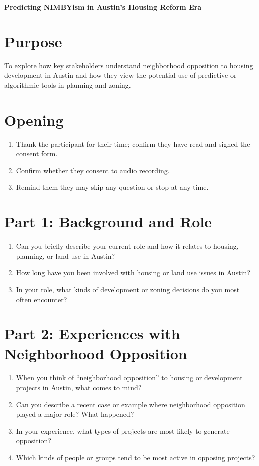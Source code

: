\documentclass[10pt, letterpaper]{article}
\begin{document}
\begin{center}
    {\Large \textbf{\color{columbiablue_official} Predicting NIMBYism in Austin’s Housing Reform Era}}
\end{center}

\section*{Purpose}
To explore how key stakeholders understand neighborhood opposition to housing development in Austin and how they view the potential use of predictive or algorithmic tools in planning and zoning.

\section*{Opening}
\begin{enumerate}[leftmargin=*, label=\arabic*.]
    \item Thank the participant for their time; confirm they have read and signed the consent form.
    \item Confirm whether they consent to audio recording.
    \item Remind them they may skip any question or stop at any time.
\end{enumerate}

\section*{Part 1: Background and Role}
\begin{enumerate}[leftmargin=*, label=\arabic*.]
    \item Can you briefly describe your current role and how it relates to housing, planning, or land use in Austin?
    \item How long have you been involved with housing or land use issues in Austin?
    \item In your role, what kinds of development or zoning decisions do you most often encounter?
\end{enumerate}

\section*{Part 2: Experiences with Neighborhood Opposition}
\begin{enumerate}[leftmargin=*, label=\arabic*.]
    \item When you think of “neighborhood opposition” to housing or development projects in Austin, what comes to mind?
    \item Can you describe a recent case or example where neighborhood opposition played a major role? What happened?
    \item In your experience, what types of projects are most likely to generate opposition?
    \item Which kinds of people or groups tend to be most active in opposing projects?
\end{enumerate}
\end{document}

